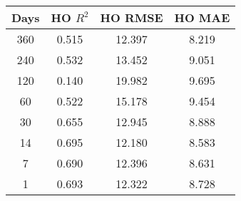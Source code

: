 \begin{tabular}{||c c c c||}
\hline
Days & HO $R^2$ & HO RMSE & HO MAE \\
\hline\hline
360 & 0.515 & 12.397 & 8.219 \\
240 & 0.532 & 13.452 & 9.051 \\
120 & 0.140 & 19.982 & 9.695 \\
60 & 0.522 & 15.178 & 9.454 \\
30 & 0.655 & 12.945 & 8.888 \\
14 & 0.695 & 12.180 & 8.583 \\
7 & 0.690 & 12.396 & 8.631 \\
1 & 0.693 & 12.322 & 8.728 \\
\hline
\end{tabular}
